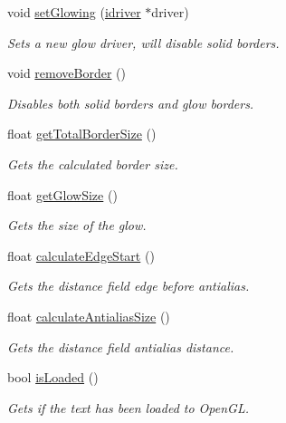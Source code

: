 \begin{DoxyCompactItemize}
void \hyperlink{classflounder_1_1text_a09b4a646005f50e7b73e6eed5b0492ad}{set\+Glowing} (\hyperlink{classflounder_1_1idriver}{idriver} $\ast$driver)
\begin{DoxyCompactList}\small\item\em Sets a new glow driver, will disable solid borders. \end{DoxyCompactList}\item 
void \hyperlink{classflounder_1_1text_a55496b7300a9fd68d56f9ecf7f9351d8}{remove\+Border} ()
\begin{DoxyCompactList}\small\item\em Disables both solid borders and glow borders. \end{DoxyCompactList}\item 
float \hyperlink{classflounder_1_1text_a374447968e82dd7e58e1cfb84c4adfb6}{get\+Total\+Border\+Size} ()
\begin{DoxyCompactList}\small\item\em Gets the calculated border size. \end{DoxyCompactList}\item 
float \hyperlink{classflounder_1_1text_ad4c9fe99e6285ba919a21cebb278472b}{get\+Glow\+Size} ()
\begin{DoxyCompactList}\small\item\em Gets the size of the glow. \end{DoxyCompactList}\item 
float \hyperlink{classflounder_1_1text_a2a2ae8e21f3813120d01664ae1f6b946}{calculate\+Edge\+Start} ()
\begin{DoxyCompactList}\small\item\em Gets the distance field edge before antialias. \end{DoxyCompactList}\item 
float \hyperlink{classflounder_1_1text_ade6f72f44e758528317072049dfc9248}{calculate\+Antialias\+Size} ()
\begin{DoxyCompactList}\small\item\em Gets the distance field antialias distance. \end{DoxyCompactList}\item 
bool \hyperlink{classflounder_1_1text_adb04bc6937cf7d117c489947bbff7635}{is\+Loaded} ()
\begin{DoxyCompactList}\small\item\em Gets if the text has been loaded to Open\+GL. \end{DoxyCompactList}\end{DoxyCompactItemize}
